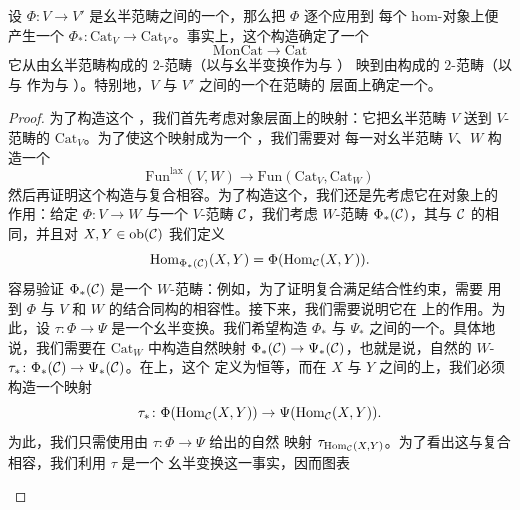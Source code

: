 \begin{lemma}\label{lem:lax-monoidal-cat-v}
设 $\Phi\colon V \to V'$ 是幺半范畴之间的一个\trLaxMonoidalFunctor{}，那么把 $\Phi$ 逐个应用到
每个 hom-对象上便产生一个\trFunctor{} $\Phi_*\colon \mathrm{Cat}_V \to \mathrm{Cat}_{V'}$。事实上，这个构造确定了一个 \trTwoFunctor{}%
\[
\mathrm{MonCat} \to \mathrm{Cat}
\]
它从由幺半范畴构成的 $2$-范畴（以\trLaxMonoidalFunctor{}与幺半变换作为\trMorphism{}与 \trTwoMorphism{}）
映到由\trCategory{}构成的 $2$-范畴（以\trFunctor{}与\trNaturalTransformation{}%
作为\trMorphism{}与 \trTwoMorphism{}）。特别地，$V$ 与 $V'$ 之间的一个\trMonoidalAdjunction{}在\trEnrichment{}范畴的
层面上确定一个\trAdjunction{}。
\end{lemma}

\begin{proof}
为了构造这个 \trTwoFunctor{}，我们首先考虑对象层面上的映射：它把幺半范畴 $V$ 送到 $V$-\trEnrichment{}%
范畴的\trCategory{} $\mathrm{Cat}_V$。为了使这个映射成为一个 \trTwoFunctor{}，我们需要对
每一对幺半范畴 $V$、$W$ 构造一个\trFunctor{}%
\[
\mathrm{Fun}^{\mathrm{lax}}(V, W) \to \mathrm{Fun}(\mathrm{Cat}_V, \mathrm{Cat}_W)
\]
然后再证明这个构造与复合相容。为了构造这个\trFunctor{}，我们还是先考虑它在对象上的
作用：给定\trLaxMonoidalFunctor{} $\Phi\colon V \to W$ 与一个 $V$-\trEnrichment{}范畴 $\mathcal{C}$，我们考虑
$W$-\trEnrichment{}范畴 $\Phi_*(\mathcal{C})$，其\trObject{}与 $\mathcal{C}$ 的\trObject{}相同，并且对
$X, Y \in \mathrm{ob}(\mathcal{C})$ 我们定义
\[
\mathrm{Hom}_{\Phi_*(\mathcal{C})}(X, Y) = \Phi(\mathrm{Hom}_{\mathcal{C}}(X, Y)).
\]
容易验证 $\Phi_*(\mathcal{C})$ 是一个 $W$-\trEnrichment{}范畴：例如，为了证明复合满足结合性约束，需要
用到 $\Phi$ 与 $V$ 和 $W$ 的结合同构的相容性。接下来，我们需要说明它在\trMorphism{}%
上的作用。为此，设 $\tau\colon \Phi \to \Psi$ 是一个幺半变换。我们希望构造
$\Phi_*$ 与 $\Psi_*$ 之间的一个\trNaturalTransformation{}。具体地说，我们需要在
$\mathrm{Cat}_W$ 中构造自然映射 $\Phi_*(\mathcal{C}) \to \Psi_*(\mathcal{C})$，也就是说，自然的
$W$-\trEnrichment{}\trFunctor{} $\tau_*\colon \Phi_*(\mathcal{C}) \to \Psi_*(\mathcal{C})$。在\trObject{}上，这个\trFunctor{}%
定义为恒等，而在 $X$ 与 $Y$ 之间的\trMorphism{}上，我们必须构造一个映射
\[
\tau_*\colon \Phi(\mathrm{Hom}_{\mathcal{C}}(X, Y)) \to \Psi(\mathrm{Hom}_{\mathcal{C}}(X, Y)).
\]
为此，我们只需使用由\trNaturalTransformation{} $\tau\colon \Phi \to \Psi$ 给出的自然
映射 $\tau_{\mathrm{Hom}_{\mathcal{C}}(X, Y)}$。为了看出这与复合相容，我们利用 $\tau$ 是一个
幺半变换这一事实，因而图表
\begin{center}
\end{center}
\end{proof}
